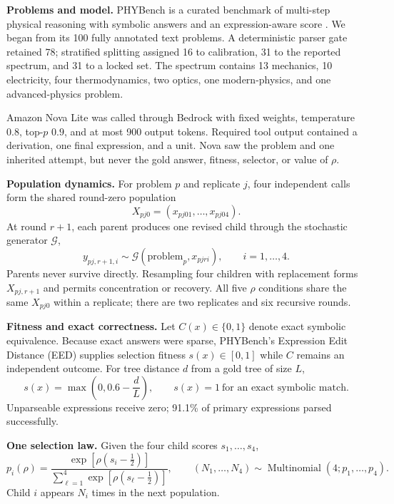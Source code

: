 \documentclass[10pt]{article}
\begin{document}
\textbf{Problems and model.} PHYBench is a curated benchmark of multi-step physical reasoning with symbolic answers and an expression-aware score \cite{qiu2025}. We began from its 100 fully annotated text problems. A deterministic parser gate retained 78; stratified splitting assigned 16 to calibration, 31 to the reported spectrum, and 31 to a locked set. The spectrum contains 13 mechanics, 10 electricity, four thermodynamics, two optics, one modern-physics, and one advanced-physics problem.

Amazon Nova Lite \cite{amazonNova} was called through Bedrock with fixed weights, temperature $0.8$, top-$p$ $0.9$, and at most 900 output tokens. Required tool output contained a derivation, one final expression, and a unit. Nova saw the problem and one inherited attempt, but never the gold answer, fitness, selector, or value of $\rho$.

\textbf{Population dynamics.} For problem $p$ and replicate $j$, four independent calls form the shared round-zero population
\[
X_{pj0}=(x_{pj01},\ldots,x_{pj04}).
\]
At round $r+1$, each parent produces one revised child through the stochastic generator $\mathcal G$,
\[
y_{pj,r+1,i}\sim\mathcal G(\text{problem}_p,x_{pjri}),\qquad i=1,\ldots,4.
\]
Parents never survive directly. Resampling four children with replacement forms $X_{pj,r+1}$ and permits concentration or recovery. All five $\rho$ conditions share the same $X_{pj0}$ within a replicate; there are two replicates and six recursive rounds.

\textbf{Fitness and exact correctness.} Let $C(x)\in\{0,1\}$ denote exact symbolic equivalence. Because exact answers were sparse, PHYBench's Expression Edit Distance (EED) supplies selection fitness $s(x)\in[0,1]$ while $C$ remains an independent outcome. For tree distance $d$ from a gold tree of size $L$,
\begin{equation}\label{eq:eed}
s(x)=\max\!\left(0,0.6-\frac{d}{L}\right),
\qquad s(x)=1\ \text{for an exact symbolic match}.
\end{equation}
Unparseable expressions receive zero; 91.1\% of primary expressions parsed successfully.

\textbf{One selection law.} Given the four child scores $s_1,\ldots,s_4$,
\begin{equation}\label{eq:selection}
p_i(\rho)=\frac{\exp[\rho(s_i-\tfrac12)]}
{\sum_{\ell=1}^{4}\exp[\rho(s_\ell-\tfrac12)]},
\qquad (N_1,\ldots,N_4)\sim\operatorname{Multinomial}(4;p_1,\ldots,p_4).
\end{equation}
Child $i$ appears $N_i$ times in the next population.
\end{document}
